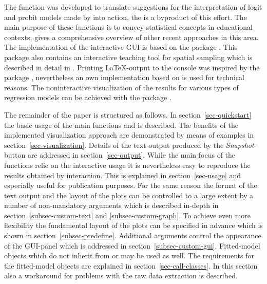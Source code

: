 \documentclass[nojss]{jss}
\begin{document}
The function  was developed to translate suggestions for the interpretation of logit and probit models made by \citet{Hoet2007} into action, the  is a byproduct of this effort. The main purpose of these functions is to convey statistical concepts in educational contexts, \citet{Xie2013} gives a comprehensive overview of other recent approaches in this area. The implementation of the interactive GUI is based on the package  \citep{BowmCrawAlex2007}. This package also contains an interactive teaching tool for spatial sampling which is described in detail in \citet{BowmGibsScot2010}. Printing \LaTeX-output to the console was inspired by the package  \citep{Dahl2012}, nevertheless an own implementation based on  is used for technical reasons. The noninteractive visualization of the results for various types of regression models can be achieved with the package  \citep{Fox2003}.

The remainder of the paper is structured as follows. In section~\ref{sec-quickstart} the basic usage of the main functions  and  is described. The benefits of the implemented  visualization approach are demonstrated by means of examples  in section~\ref{sec-visualization}.  Details of the text output produced by the \textit{Snapshot}-button are addressed in section~\ref{sec-output}. While the main focus of the functions relie on the interactive usage it is nevertheless easy to reproduce the results obtained by interaction. This is explained in section~\ref{sec-usage} and especially useful for publication purposes. For the same reason the format of the text output and the layout of the plots  can be controlled to a large extent by a number of non-mandatory arguments which is  described in-depth in section~\ref{subsec-custom-text} and \ref{subsec-custom-graph}. To achieve even more flexibility the fundamental layout of the plots can be specified in advance which is shown in section~\ref{subsec-predefine}. Additional arguments control the appearance of the GUI-panel which is addressed in section~\ref{subsec-custom-gui}. Fitted-model objects which do not inherit from  or  may be used as well. The requirements for the fitted-model objects are explained in section~\ref{sec-call-classes}. In this section also a workaround for problems with the raw data extraction is described.
\end{document}
